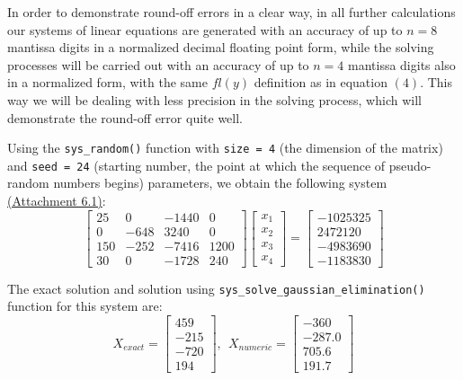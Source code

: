 \documentclass[letterpaper,12pt]{article}
\begin{document}
In order to demonstrate round-off errors in a clear way, in all further calculations our systems of linear equations are generated with an accuracy of up to $n=8$ mantissa digits in a normalized decimal floating point form, while the solving processes will be carried out with an accuracy of up to $n=4$ mantissa digits also in a normalized form, with the same $fl(y)$ definition as in equation $(4)$. This way we will be dealing with less precision in the solving process, which will demonstrate the round-off error quite well.

Using the \verb|sys_random()| function with \verb|size = 4| (the dimension of the matrix) and \verb|seed = 24| (starting number, the point at which the sequence of pseudo-random numbers begins) parameters, we obtain the following system \hyperref[a:E1]{(Attachment 6.1)}:
\begin{equation}
    \begin{bmatrix}
        25    &       0        &    -1440    &    0\\
        0     &       -648     &    3240     &    0\\ 
        150   &       -252     &    -7416    &    1200\\
        30    &       0        &    -1728    &    240 
    \end{bmatrix}
    \begin{bmatrix}
        x_1\\
        x_2\\
        x_3\\
        x_4
    \end{bmatrix}
    =
    \begin{bmatrix}
        -1025325\\
        2472120\\
        -4983690\\
        -1183830
    \end{bmatrix}
\end{equation}

The exact solution and solution using \verb|sys_solve_gaussian_elimination()| function for this system are:
\begin{equation}
    X_{exact} = 
    \begin{bmatrix}
        459\\
        -215\\
        -720\\
        194
    \end{bmatrix}, \ \
    X_{numeric} = 
    \begin{bmatrix}
         -360\\
         -287.0\\
         705.6\\
         191.7    
    \end{bmatrix}
\end{equation}
\end{document}

